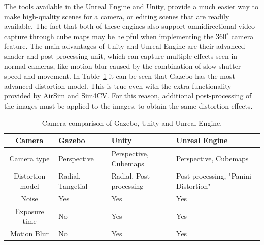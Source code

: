 The tools available in the Unreal Engine and Unity, provide a much easier way to make high-quality scenes for a camera, or editing scenes that are readily available. The fact that both of these engines also support omnidirectional video capture through cube maps may be helpful when implementing the $360^\circ$ camera feature. The main advantages of Unity and Unreal Engine are their advanced shader and post-processing unit, which can capture multiple effects seen in normal cameras, like motion blur caused by the combination of slow shutter speed and movement. In Table~\ref{tab:comparison_camera} it can be seen that Gazebo has the most advanced distortion model. This is true even with the extra functionality provided by AirSim and Sim4CV. For this reason, additional post-processing of the images must be applied to the images, to obtain the same distortion effects.

\begin{table}[!htb]
    \centering
    \caption{Camera comparison of Gazebo, Unity and Unreal Engine.}
    \label{tab:comparison_camera}
    \begin{tabular}{|c|>{\centering\arraybackslash}m{3.5cm}|>{\centering\arraybackslash}m{3.7cm}|>{\centering\arraybackslash}m{4cm}|} \hline
        \textbf{Camera} & \textbf{Gazebo} & \textbf{Unity} & \textbf{Unreal Engine} \\ \hline\hline
        Camera type     & Perspective & Perspective, Cubemaps & Perspective, Cubemaps \\ \hline
        Distortion model & Radial, Tangetial & Radial, Post-processing  & Post-processing, "Panini Distortion"\cite{panini} \\ \hline
        Noise           & Yes & Yes & Yes \\ \hline
        Exposure time   & No & Yes & Yes \\ \hline
        Motion Blur     & No & Yes & Yes \\ \hline
        
    \end{tabular}
\end{table}


